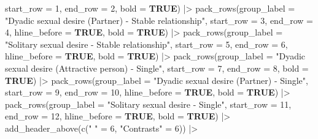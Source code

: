 \documentclass[
  bookmarksnumbered]{article}
\newenvironment{Shaded}{\begin{snugshade}}{\end{snugshade}}
\newcommand{\AttributeTok}[1]{\textcolor[rgb]{0.80,0.80,0.80}{#1}}
\newcommand{\ConstantTok}[1]{\textcolor[rgb]{0.86,0.64,0.64}{\textbf{#1}}}
\newcommand{\DecValTok}[1]{\textcolor[rgb]{0.86,0.86,0.80}{#1}}
\newcommand{\FunctionTok}[1]{\textcolor[rgb]{0.94,0.94,0.56}{#1}}
\newcommand{\NormalTok}[1]{\textcolor[rgb]{0.80,0.80,0.80}{#1}}
\newcommand{\OtherTok}[1]{\textcolor[rgb]{0.94,0.94,0.56}{#1}}
\newcommand{\SpecialCharTok}[1]{\textcolor[rgb]{0.86,0.64,0.64}{#1}}
\newcommand{\StringTok}[1]{\textcolor[rgb]{0.80,0.58,0.58}{#1}}
\begin{document}
\begin{Shaded}
\begin{Highlighting}[]
            \AttributeTok{start\_row =} \DecValTok{1}\NormalTok{,}
            \AttributeTok{end\_row =} \DecValTok{2}\NormalTok{,}
            \AttributeTok{bold =} \ConstantTok{TRUE}\NormalTok{) }\SpecialCharTok{|\textgreater{}}
  \FunctionTok{pack\_rows}\NormalTok{(}\AttributeTok{group\_label =} \StringTok{"Dyadic sexual desire (Partner) {-} Stable relationship"}\NormalTok{,}
            \AttributeTok{start\_row =} \DecValTok{3}\NormalTok{,}
            \AttributeTok{end\_row =} \DecValTok{4}\NormalTok{,}
            \AttributeTok{hline\_before =} \ConstantTok{TRUE}\NormalTok{,}
            \AttributeTok{bold =} \ConstantTok{TRUE}\NormalTok{) }\SpecialCharTok{|\textgreater{}}
  \FunctionTok{pack\_rows}\NormalTok{(}\AttributeTok{group\_label =} \StringTok{"Solitary sexual desire {-} Stable relationship"}\NormalTok{,}
            \AttributeTok{start\_row =} \DecValTok{5}\NormalTok{,}
            \AttributeTok{end\_row =} \DecValTok{6}\NormalTok{,}
            \AttributeTok{hline\_before =} \ConstantTok{TRUE}\NormalTok{,}
            \AttributeTok{bold =} \ConstantTok{TRUE}\NormalTok{) }\SpecialCharTok{|\textgreater{}}
  \FunctionTok{pack\_rows}\NormalTok{(}\AttributeTok{group\_label =} \StringTok{"Dyadic sexual desire (Attractive person) {-} Single"}\NormalTok{,}
            \AttributeTok{start\_row =} \DecValTok{7}\NormalTok{,}
            \AttributeTok{end\_row =} \DecValTok{8}\NormalTok{,}
            \AttributeTok{bold =} \ConstantTok{TRUE}\NormalTok{) }\SpecialCharTok{|\textgreater{}}
  \FunctionTok{pack\_rows}\NormalTok{(}\AttributeTok{group\_label =} \StringTok{"Dyadic sexual desire (Partner) {-} Single"}\NormalTok{,}
            \AttributeTok{start\_row =} \DecValTok{9}\NormalTok{,}
            \AttributeTok{end\_row =} \DecValTok{10}\NormalTok{,}
            \AttributeTok{hline\_before =} \ConstantTok{TRUE}\NormalTok{,}
            \AttributeTok{bold =} \ConstantTok{TRUE}\NormalTok{) }\SpecialCharTok{|\textgreater{}}
  \FunctionTok{pack\_rows}\NormalTok{(}\AttributeTok{group\_label =} \StringTok{"Solitary sexual desire {-} Single"}\NormalTok{,}
            \AttributeTok{start\_row =} \DecValTok{11}\NormalTok{,}
            \AttributeTok{end\_row =} \DecValTok{12}\NormalTok{,}
            \AttributeTok{hline\_before =} \ConstantTok{TRUE}\NormalTok{,}
            \AttributeTok{bold =} \ConstantTok{TRUE}\NormalTok{) }\SpecialCharTok{|\textgreater{}}
  \FunctionTok{add\_header\_above}\NormalTok{(}\FunctionTok{c}\NormalTok{(}\StringTok{" "} \OtherTok{=} \DecValTok{6}\NormalTok{, }\StringTok{"Contrasts"} \OtherTok{=} \DecValTok{6}\NormalTok{)) }\SpecialCharTok{|\textgreater{}} 

\end{Highlighting}
\end{Shaded}
\end{document}

